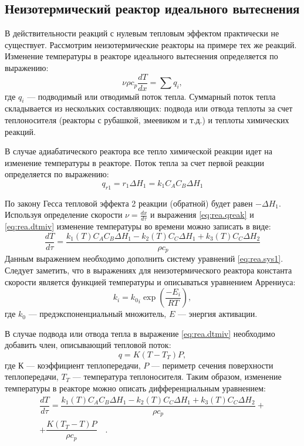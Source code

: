 \subsection*{Неизотермический реактор идеального вытеснения}
В действительности реакций с нулевым тепловым эффектом практически не существует. Рассмотрим неизотермические реакторы на примере тех же реакций.
Изменение температуры в реакторе идеального вытеснения определяется по выражению:
\begin{equation}\label{eq:rea.dtmiv}
	\nu \rho c_p \dfrac{d T}{d x} = \sum q_i ,
\end{equation}
где $q_i$ --- подводимый или отводимый поток тепла. Суммарный поток тепла складывается из нескольких составляющих: подвода или отвода теплоты за счет теплоносителя (реакторы с рубашкой, змеевиком и т.д.) и теплоты химических реакций. 

В случае адиабатического реактора все тепло химической реакции идет на изменение температуры в реакторе. Поток тепла за счет первой реакции определяется по выражению:
\begin{equation} \label{eq:rea.qreak}
	{q_{r1}}=r_1 \Delta H_1 = k_1 C_A C_B \Delta H_1
\end{equation}

По закону Гесса тепловой эффекта 2 реакции (обратной) будет равен $-\Delta H_1$. Используя определение скорости $\nu=\frac{d x }{d \tau}$ и выражения \eqref{eq:rea.qreak} и \eqref{eq:rea.dtmiv} изменение температуры во времени можно записать в виде:
\begin{equation}\label{eq:rea.dtmiv1}
	\dfrac{d T}{d \tau}= \dfrac {k_1(T) C_A C_B \Delta H_1 -k_2(T) C_C \Delta H_1 +k_3(T) C_C \Delta H_2}{\rho c_p} 
\end{equation}
Данным выражением необходимо дополнить систему уравнений \eqref{eq:rea.sys1}. Следует заметить, что в выражениях для  неизотермического реактора константа скорости является функцией температуры и описываться уравнением Аррениуса:
\begin{equation}
	k_i={k_0}_i \exp \left( \dfrac{-E_i}{RT}\right),
\end{equation}
где $k_0$ --- предэкспоненциальный множитель,  $E$ --- энергия активации.

В случае подвода или отвода тепла в выражение \eqref{eq:rea.dtmiv} необходимо добавить член, описывающий тепловой поток: 
\begin{equation}
	q=K(T-T_T)P,
\end{equation}
где $К$ --- коэффициент теплопередачи, $P$ --- периметр сечения поверхности теплопередачи, $T_T$ --- температура теплоносителя. Таким образом, изменение температуры в реакторе можно описать дифференциальным уравнением:
\begin{eqnarray}\label{eq:rea.dtmiv2}
\dfrac{d T}{d \tau}= \dfrac {k_1(T) C_A C_B \Delta H_1 -k_2(T) C_C \Delta H_1 +k_3(T) C_C \Delta H_2}{\rho c_p} + \nonumber \\ + \dfrac{K(T_T-T)P}{\rho c_p} \quad.
\end{eqnarray}

